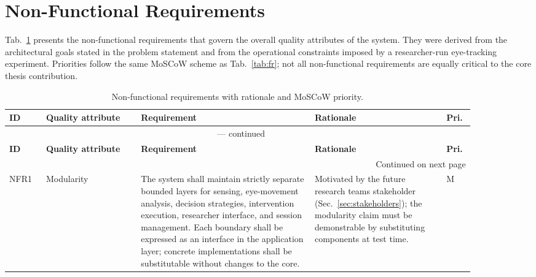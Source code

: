 \section{Non-Functional Requirements}
\label{sec:non-functional-requirements}

Tab.~\ref{tab:nfr} presents the non-functional requirements that govern the
overall quality attributes of the system.
They were derived from the architectural goals stated in the problem statement
and from the operational constraints imposed by a researcher-run eye-tracking
experiment.
Priorities follow the same MoSCoW scheme \cite{clegg1994moscow} as Tab.~\ref{tab:fr}; not all
non-functional requirements are equally critical to the core thesis contribution.

\begingroup
\small
\begin{longtable}{%
  p{0.07\linewidth}
  p{0.18\linewidth}
  p{0.33\linewidth}
  p{0.25\linewidth}
  p{0.05\linewidth}
}
\caption{Non-functional requirements with rationale and MoSCoW priority.}
\label{tab:nfr} \\
\toprule
\textbf{ID} & \textbf{Quality attribute} & \textbf{Requirement} & \textbf{Rationale} & \textbf{Pri.} \\
\midrule
\endfirsthead

\multicolumn{5}{c}{\tablename~\thetable{} — continued} \\
\toprule
\textbf{ID} & \textbf{Quality attribute} & \textbf{Requirement} & \textbf{Rationale} & \textbf{Pri.} \\
\midrule
\endhead

\midrule
\multicolumn{5}{r}{\footnotesize Continued on next page} \\
\endfoot

\bottomrule
\endlastfoot

NFR1 & Modularity &
  The system shall maintain strictly separate bounded layers for sensing,
  eye-movement analysis, decision strategies, intervention execution,
  researcher interface, and session management.
  Each boundary shall be expressed as an interface in the application layer;
  concrete implementations shall be substitutable without changes to the core. &
  Motivated by the future research teams stakeholder
  (Sec.~\ref{sec:stakeholders}); the modularity claim must be demonstrable
  by substituting components at test time. & M \\
\midrule


\end{longtable}
